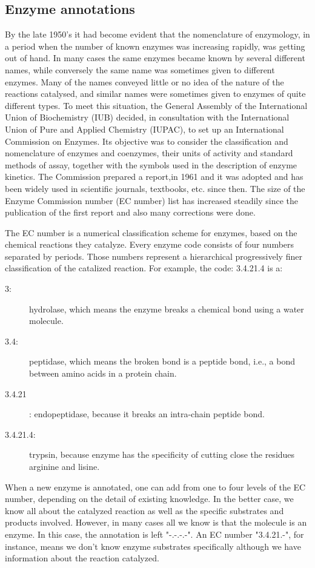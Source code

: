 \subsection{Enzyme annotations}

By the late 1950's it had become evident that the nomenclature of enzymology, in a period when the number of known enzymes was increasing rapidly, was getting out of hand. In many cases the same enzymes became known by several different names, while conversely the same name was sometimes given to different enzymes. Many of the names conveyed little or no idea of the nature of the reactions catalysed, and similar names were sometimes given to enzymes of quite different types. To meet this situation, the General Assembly of the International Union of Biochemistry (IUB) decided, in consultation with the International Union of Pure and Applied Chemistry (IUPAC), to set up an International Commission on Enzymes. Its objective was to consider the classification and nomenclature of enzymes and coenzymes, their units of activity and standard methods of assay, together with the symbols used in the description of enzyme kinetics. The Commission prepared a report,in 1961 and it was adopted and has been widely used in scientific journals, textbooks, etc. since then. The size of the Enzyme Commission number (EC number) list has increased steadily since the publication of the first report and also many corrections were done.

The  EC number is a numerical classification scheme for enzymes, based on the chemical reactions they catalyze. Every enzyme code consists of four numbers separated by periods. Those numbers represent a hierarchical progressively finer classification of the catalized reaction. For example, the code: 3.4.21.4 is a:
\begin{description}
\item [3:] hydrolase, which means the enzyme breaks a chemical bond using a water molecule.
\item [3.4:] peptidase, which means the broken bond is a peptide bond, i.e., a bond between amino acids in a protein chain.
\item [3.4.21]: endopeptidase, because it breaks an intra-chain peptide bond.
\item [3.4.21.4:] trypsin, because enzyme has the specificity of cutting close the residues arginine and lisine.
\end{description}

When a new enzyme is annotated, one can add from one to four levels of the EC number, depending on the detail of existing knowledge. In the better case, we know all about the catalyzed reaction as well as the specific substrates and products involved. However, in many cases all we know is that the molecule is an enzyme. In this case, the annotation is left "-.-.-.-". An EC number "3.4.21.-", for instance, means we don't know enzyme substrates specifically although we have information about the reaction catalyzed.
